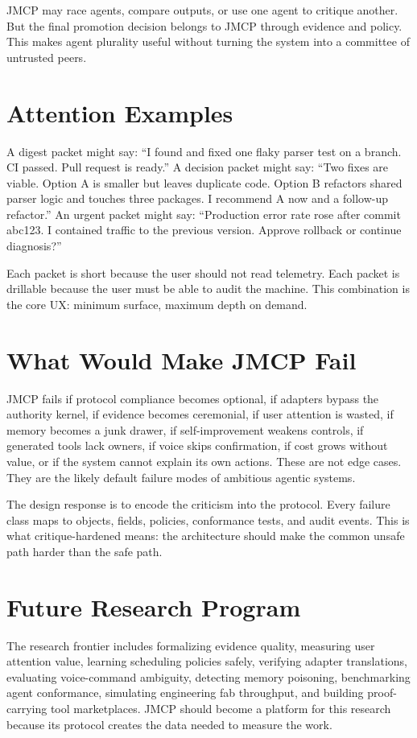 \documentclass[10pt,journal,onecolumn]{IEEEtran}
\begin{document}
JMCP may race agents, compare outputs, or use one agent to critique another. But the final promotion decision belongs to JMCP through evidence and policy. This makes agent plurality useful without turning the system into a committee of untrusted peers.

\section{Attention Examples}
A digest packet might say: ``I found and fixed one flaky parser test on a branch. CI passed. Pull request is ready.'' A decision packet might say: ``Two fixes are viable. Option A is smaller but leaves duplicate code. Option B refactors shared parser logic and touches three packages. I recommend A now and a follow-up refactor.'' An urgent packet might say: ``Production error rate rose after commit abc123. I contained traffic to the previous version. Approve rollback or continue diagnosis?''

Each packet is short because the user should not read telemetry. Each packet is drillable because the user must be able to audit the machine. This combination is the core UX: minimum surface, maximum depth on demand.

\section{What Would Make JMCP Fail}
JMCP fails if protocol compliance becomes optional, if adapters bypass the authority kernel, if evidence becomes ceremonial, if user attention is wasted, if memory becomes a junk drawer, if self-improvement weakens controls, if generated tools lack owners, if voice skips confirmation, if cost grows without value, or if the system cannot explain its own actions. These are not edge cases. They are the likely default failure modes of ambitious agentic systems.

The design response is to encode the criticism into the protocol. Every failure class maps to objects, fields, policies, conformance tests, and audit events. This is what critique-hardened means: the architecture should make the common unsafe path harder than the safe path.

\section{Future Research Program}
The research frontier includes formalizing evidence quality, measuring user attention value, learning scheduling policies safely, verifying adapter translations, evaluating voice-command ambiguity, detecting memory poisoning, benchmarking agent conformance, simulating engineering fab throughput, and building proof-carrying tool marketplaces. JMCP should become a platform for this research because its protocol creates the data needed to measure the work.
\end{document}
